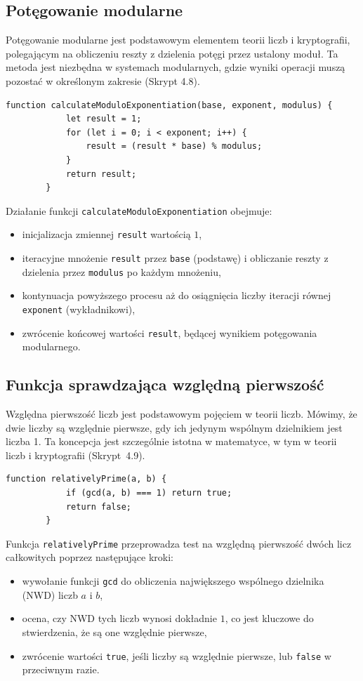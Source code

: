 \documentclass{SGGW-thesis}
\begin{document}
	\subsection{Potęgowanie modularne}
	Potęgowanie modularne jest podstawowym elementem teorii liczb i kryptografii, polegającym na obliczeniu reszty z dzielenia potęgi przez ustalony moduł. Ta metoda jest niezbędna w systemach modularnych, gdzie wyniki operacji muszą pozostać w określonym zakresie (Skrypt 4.8).
	\vspace{1em}
	\begin{lstlisting}[caption=Funkcja potęgowania modularnego w JavaScript]
		function calculateModuloExponentiation(base, exponent, modulus) {
			let result = 1;
			for (let i = 0; i < exponent; i++) {
				result = (result * base) % modulus;
			}
			return result;
		}
	\end{lstlisting}
	\vspace{1em}
	Działanie funkcji \texttt{calculateModuloExponentiation} obejmuje:
	\begin{itemize}
		\item inicjalizacja zmiennej \texttt{result} wartością \( 1 \),
		\item iteracyjne mnożenie \texttt{result} przez \texttt{base} (podstawę) i obliczanie reszty z dzielenia przez \texttt{modulus} po każdym mnożeniu,
		\item kontynuacja powyższego procesu aż do osiągnięcia liczby iteracji równej \texttt{exponent} (wykładnikowi),
		\item zwrócenie końcowej wartości \texttt{result}, będącej wynikiem potęgowania modularnego.
	\end{itemize}
	\newpage

	\subsection{Funkcja sprawdzająca względną pierwszość}
	Względna pierwszość liczb jest podstawowym pojęciem w teorii liczb. Mówimy, że dwie liczby są względnie pierwsze, gdy ich jedynym wspólnym dzielnikiem jest liczba 1. Ta koncepcja jest szczególnie istotna w matematyce, w tym w teorii liczb i kryptografii (Skrypt~4.9).
	\vspace{1em}
	\begin{lstlisting}[caption=Funkcja do weryfikacji względnej pierwszości w JavaScript]
		function relativelyPrime(a, b) {
			if (gcd(a, b) === 1) return true;
			return false;
		}
	\end{lstlisting}
	\vspace{1em}
	Funkcja \texttt{relativelyPrime} przeprowadza test na względną pierwszość dwóch licz całkowitych poprzez następujące kroki:
	\begin{itemize}
		\item wywołanie funkcji \texttt{gcd} do obliczenia największego wspólnego dzielnika (NWD) liczb \(a\) i \(b\),
		\item ocena, czy NWD tych liczb wynosi dokładnie \( 1 \), co jest kluczowe do stwierdzenia, że są one względnie pierwsze,
		\item zwrócenie wartości \texttt{true}, jeśli liczby są względnie pierwsze, lub \texttt{false} w przeciwnym razie.
	\end{itemize}
	\newpage
	
\end{document}
